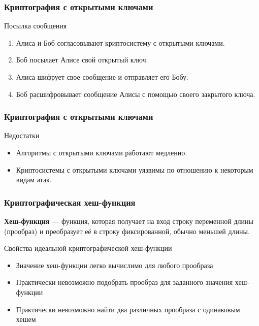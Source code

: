 \documentclass{beamer}
\newcommand{\define}[2]{{\bf #1} --- #2.\vspace{1em}}
\begin{document}
\begin{frame}
  \frametitle{Криптография с открытыми ключами}
  \begin{block}{Посылка сообщения}
    \begin{enumerate}
      \item{Алиса и Боб согласовывают криптосистему с открытыми ключами.}
      \item{Боб посылает Алисе свой открытый ключ.}
      \item{Алиса шифрует свое сообщение и отправляет его Бобу.}
      \item{Боб расшифровывает сообщение Алисы с помощью своего закрытого ключа.}
    \end{enumerate}
  \end{block}
\end{frame}


\begin{frame}
  \frametitle{Криптография с открытыми ключами}
  \begin{block}{Недостатки}
    \begin{itemize}
      \item{Алгоритмы с открытыми ключами работают медленно.}
      \item{Криптосистемы с открытыми ключами уязвимы по отношению к некоторым видам атак.}
    \end{itemize}
  \end{block}
\end{frame}


\begin{frame}
  \frametitle{Криптографическая хеш-функция}

  \define {Хеш-функция} {функция, которая получает на вход строку переменной длины (прообраз) и преобразует её в строку
           фиксированной, обычно меньшей длины}
  \begin{block} {Свойства идеальной криптографической хеш-функции}
    \begin{itemize}
      \item{Значение хеш-функции легко вычислимо для любого прообраза}
      \item{Практически невозможно подобрать прообраз для заданного значения хеш-функции}
      \item{Практически невозможно найти два различных прообраза с одинаковым хешем}
    \end{itemize}
  \end{block}
\end{frame}
\end{document}
